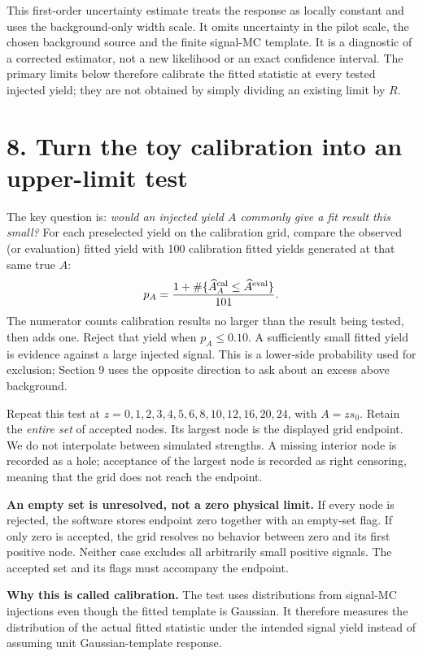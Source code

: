 \documentclass[11pt]{article}
\newcommand{\Ah}{\widehat A}\newcommand{\sh}{\widehat\sigma}
\begin{document}
This first-order uncertainty estimate treats the response as locally constant and uses the background-only width scale. It omits uncertainty in the pilot scale, the chosen background source and the finite signal-MC template. It is a diagnostic of a corrected estimator, not a new likelihood or an exact confidence interval. The primary limits below therefore calibrate the fitted statistic at every tested injected yield; they are not obtained by simply dividing an existing limit by $R$.
\clearpage\section*{8. Turn the toy calibration into an upper-limit test}

The key question is: \emph{would an injected yield $A$ commonly give a fit result this small?} For each preselected yield on the calibration grid, compare the observed (or evaluation) fitted yield with 100 calibration fitted yields generated at that same true $A$:
\[
 p_A=\frac{1+\#\{\Ah_A^{\rm cal}\le\Ah^{\rm eval}\}}{101}.
\]
The numerator counts calibration results no larger than the result being tested, then adds one. Reject that yield when $p_A\le0.10$. A sufficiently small fitted yield is evidence against a large injected signal. This is a lower-side probability used for exclusion; Section 9 uses the opposite direction to ask about an excess above background.

Repeat this test at $z=0,1,2,3,4,5,6,8,10,12,16,20,24$, with $A=z s_0$. Retain the \emph{entire set} of accepted nodes. Its largest node is the displayed grid endpoint. We do not interpolate between simulated strengths. A missing interior node is recorded as a hole; acceptance of the largest node is recorded as right censoring, meaning that the grid does not reach the endpoint.

\textbf{An empty set is unresolved, not a zero physical limit.} If every node is rejected, the software stores endpoint zero together with an empty-set flag. If only zero is accepted, the grid resolves no behavior between zero and its first positive node. Neither case excludes all arbitrarily small positive signals. The accepted set and its flags must accompany the endpoint.

\textbf{Why this is called calibration.} The test uses distributions from signal-MC injections even though the fitted template is Gaussian. It therefore measures the distribution of the actual fitted statistic under the intended signal yield instead of assuming unit Gaussian-template response.
\end{document}
